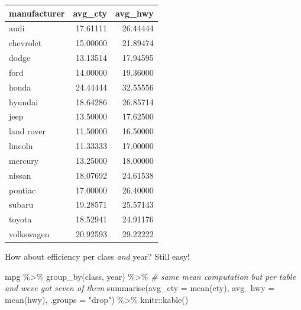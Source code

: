 \documentclass[
]{book}
\newenvironment{Shaded}{\begin{snugshade}}{\end{snugshade}}
\newcommand{\AttributeTok}[1]{\textcolor[rgb]{0.77,0.63,0.00}{#1}}
\newcommand{\CommentTok}[1]{\textcolor[rgb]{0.56,0.35,0.01}{\textit{#1}}}
\newcommand{\FunctionTok}[1]{\textcolor[rgb]{0.00,0.00,0.00}{#1}}
\newcommand{\NormalTok}[1]{#1}
\newcommand{\SpecialCharTok}[1]{\textcolor[rgb]{0.00,0.00,0.00}{#1}}
\newcommand{\StringTok}[1]{\textcolor[rgb]{0.31,0.60,0.02}{#1}}
\begin{document}
\begin{tabular}{l|r|r}
\hline
manufacturer & avg\_cty & avg\_hwy\\
\hline
audi & 17.61111 & 26.44444\\
\hline
chevrolet & 15.00000 & 21.89474\\
\hline
dodge & 13.13514 & 17.94595\\
\hline
ford & 14.00000 & 19.36000\\
\hline
honda & 24.44444 & 32.55556\\
\hline
hyundai & 18.64286 & 26.85714\\
\hline
jeep & 13.50000 & 17.62500\\
\hline
land rover & 11.50000 & 16.50000\\
\hline
lincoln & 11.33333 & 17.00000\\
\hline
mercury & 13.25000 & 18.00000\\
\hline
nissan & 18.07692 & 24.61538\\
\hline
pontiac & 17.00000 & 26.40000\\
\hline
subaru & 19.28571 & 25.57143\\
\hline
toyota & 18.52941 & 24.91176\\
\hline
volkswagen & 20.92593 & 29.22222\\
\hline
\end{tabular}

How about efficiency per class \emph{and} year? Still easy!

\begin{Shaded}
\begin{Highlighting}[]
\NormalTok{mpg }\SpecialCharTok{\%\textgreater{}\%}
  \FunctionTok{group\_by}\NormalTok{(class, year)  }\SpecialCharTok{\%\textgreater{}\%}
  \CommentTok{\# same mean computation but per table and we\textquotesingle{}ve got seven of them}
  \FunctionTok{summarise}\NormalTok{(}\AttributeTok{avg\_cty =} \FunctionTok{mean}\NormalTok{(cty),}
            \AttributeTok{avg\_hwy =} \FunctionTok{mean}\NormalTok{(hwy), }\AttributeTok{.groups =} \StringTok{"drop"}\NormalTok{) }\SpecialCharTok{\%\textgreater{}\%}
\NormalTok{  knitr}\SpecialCharTok{::}\FunctionTok{kable}\NormalTok{()}
\end{Highlighting}
\end{Shaded}
\end{document}

